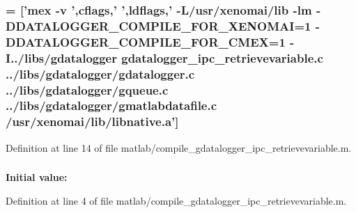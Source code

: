 \subsubsection[{command}]{ = ['mex -\/v ',{\bf cflags},' ',{\bf ldflags},' -\/L/usr/xenomai/lib -\/lm -\/DDATALOGGER\_\-COMPILE\_\-FOR\_\-XENOMAI=1 -\/DDATALOGGER\_\-COMPILE\_\-FOR\_\-CMEX=1 -\/I../libs/gdatalogger gdatalogger\_\-ipc\_\-retrievevariable.c ../libs/gdatalogger/gdatalogger.c ../libs/gdatalogger/gqueue.c ../libs/gdatalogger/gmatlabdatafile.c /usr/xenomai/lib/{\bf libnative.a}']}\label{matlab_2compile__gdatalogger__ipc__retrievevariable_8m_a9e0992eae3950adccaf4847fbff4231d}


Definition at line 14 of file matlab/compile\_\-gdatalogger\_\-ipc\_\-retrievevariable.m.
\subsubsection[{LD\_\-LIBRARY\_\-PATH}]{}\label{matlab_2compile__gdatalogger__ipc__retrievevariable_8m_ae31a3f3675344510619ba624722049cb}
{\bfseries Initial value:}


Definition at line 4 of file matlab/compile\_\-gdatalogger\_\-ipc\_\-retrievevariable.m.